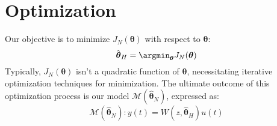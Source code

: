 \section{Optimization}

Our objective is to minimize $J_N(\boldsymbol{\theta})$ with respect to $\boldsymbol{\theta}$:
\[\hat{\boldsymbol{\theta}}_H=\argmin_{\boldsymbol{\theta}}J_N(\boldsymbol{\theta})\]
Typically, $J_N(\boldsymbol{\theta})$ isn't a quadratic function of $\boldsymbol{\theta}$, necessitating iterative optimization techniques for minimization.
The ultimate outcome of this optimization process is our model $\mathcal{M}(\hat{\boldsymbol{\theta}}_N)$, expressed as:
\[\mathcal{M}(\hat{\boldsymbol{\theta}}_N):y(t)=W(z,\hat{\boldsymbol{\theta}}_H)u(t)\]